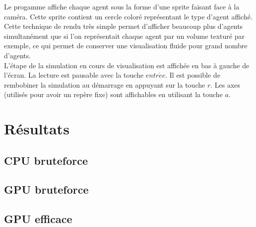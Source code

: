 Le progamme affiche chaque agent sous la forme d'une sprite faisant face à la caméra. Cette sprite contient un cercle coloré représentant le type d'agent affiché. Cette technique de rendu très simple permet d'afficher beaucoup plus d'agents simultanément que si l'on représentait chaque agent par un volume texturé par exemple, ce qui permet de conserver une visualisation fluide pour grand nombre d'agents.\\

L'étape de la simulation en cours de visualisation est affichée en bas à gauche de l'écran. 
La lecture est pausable avec la touche $entr\acute{e}e$. 
Il est possible de rembobiner la simulation au démarrage en appuyant sur la touche $r$.
Les axes (utilisés pour avoir un repère fixe) sont affichables en utilisant la touche $a$.



\section{Résultats}

\subsection{CPU bruteforce}
\subsection{GPU bruteforce}
\subsection{GPU efficace}

